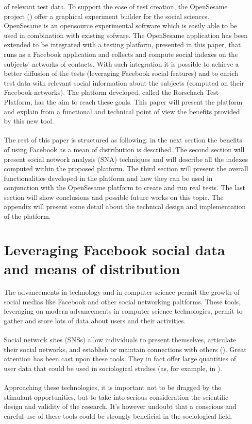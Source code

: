 of relevant test data.
To support the ease of test creation, the OpenSesame project (\cite{Matot-2011}) offer a graphical experiment builder for the social sciences.
OpenSesame is an opensource experimental software which is easily able to be used in combination with existing sofware.
The OpenSesame application has been extended to be integrated with a testing platform, presented in this paper, that runs as a Facebook application and collects and compute
social indexes on the subjects' networks of contacts.
With such integration it is possible to achieve a better diffusion of the tests (leveraging Facebook social features) and to enrich test data with relevant social
information about the subjects (computed on their Facebook networks).
The platform developed, called the Rorschach Test Platform, has the aim to reach these goals.
This paper will present the platform and explain from a functional and technical point of view the benefits provided by this new tool.\\
\\
The rest of this paper is structured as following: in the next section the benefits of using Facebook as a mean of distribution is described.
The second section will present social network analysis (SNA) techniques and will describe all the indexes computed within the proposed platform.
The third section will present the overall functionalities developed in the platform and how they can be used in conjunction with the OpenSesame platform to create
and run real tests.
The last section will show conclusions and possible future works on this topic.
The appendix will present some detail about the technical design and implementation of the platform.

\label{sec:leveraginfacebook}
\section{Leveraging Facebook social data and means of distribution}
The advancements in technology and in computer science permit the growth of social medias like Facebook and other social networking paltforms.
These tools, leveraging on modern advancements in computer science technologies, permit to gather and store lots of data about users and their activities.\\
\\
Social network sites (SNSs) allow individuals to present themselves, articulate their social networks, and establish or maintain connections with others
(\cite{Boyd-2007}).
Great attention has been cast upon these tools.
They in fact offer large quantities of user data that could be used in sociological studies (as, for example, in \cite{Ellison-2007}).\\
\\
Approaching these technologies, it is important not to be dragged by the stimulant opportunities, but to take into serious consideration the scientific design and
validity of the research.
It's however undoubt that a conscious and careful use of these tools could be strongly beneficial in the sociological field.\\
\\
